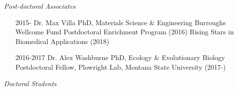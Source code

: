 \documentclass[overlapped,line,11pt]{res}
\begin{document}
\begin{resume}
\emph{Post-doctoral Associates}
\vspace{.1in}

\begin{itemize}[leftmargin=2cm, style=sameline, itemsep=0mm]

\item[2015-] Dr. Max Villa \newline 
  PhD, Materials Science \& Engineering \newline
  Burroughs Wellcome Fund Postdoctoral Enrichment Program (2016) \newline
  Rising Stars in Biomedical Applications (2018)
\item[2016-2017] Dr. Alex Washburne \newline 
  PhD, Ecology \& Evolutionary Biology \newline
  Postdoctoral Fellow, Plowright Lab, Montana State University (2017-)
  
\end{itemize}

\vspace{-.1in}
\emph{Doctoral Students}
\vspace{.1in}

\begin{itemize}[leftmargin=2cm, style=sameline, itemsep=0mm]


\end{itemize}
\end{resume}
\end{document}
